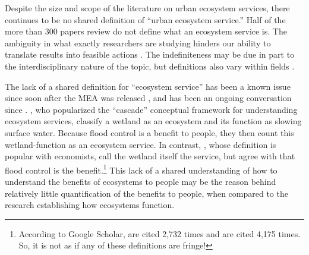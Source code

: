 \documentclass[12pt]{article}
\begin{document}
Despite the size and scope of the literature on urban ecosystem services, there continues to be no shared definition of ``urban ecosystem service.'' Half of the more than 300 papers \citet{tanConceptualFrameworkUntangle2020} review do not define what an ecosystem service is. The ambiguity in what exactly researchers are studying hinders our ability to translate results into feasible actions \citep{polaskySettingBarStandards2015}.  The indefiniteness may be due in part to the interdisciplinary nature of the topic, but definitions also vary within fields \citep{boydWhatAreEcosystem2007}. %

The lack of a shared definition for ``ecosystem service'' has been a known issue since soon after the MEA was released \citep{haines-youngLinksBiodiversityEcosystem2010}, and has been an ongoing conversation since \citep{polaskySettingBarStandards2015}.  \citet{haines-youngLinksBiodiversityEcosystem2010}, who popularized the ``cascade'' conceptual framework for understanding ecosystem services, classify a wetland as an ecosystem and its function as slowing surface water. Because flood control is a benefit to people, they then count this wetland-function as an ecosystem service. In contrast, \citet{boydWhatAreEcosystem2007}, whose definition is popular with economists, call the wetland itself the service, but agree with \citeauthor{haines-youngLinksBiodiversityEcosystem2010} that flood control is the benefit.\footnote{According to Google Scholar, \citet{haines-youngLinksBiodiversityEcosystem2010} are cited 2,732 times and \citet{boydWhatAreEcosystem2007} are cited 4,175 times. So, it is not as if any of these definitions are fringe!} This lack of a shared understanding of how to understand the benefits of ecosystems to people may be the reason behind relatively little quantification of the benefits to people, when compared to the research establishing how ecosystems function. 
\end{document}

